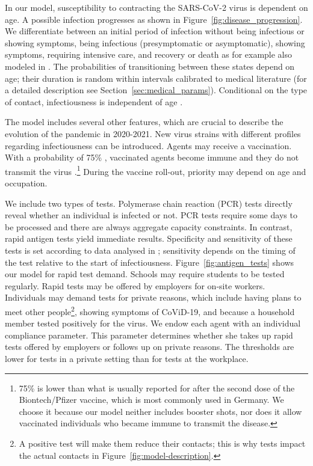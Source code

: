 In our model, susceptibility to contracting the SARS-CoV-2 virus is dependent on age. A
possible infection progresses as shown in Figure~\ref{fig:disease_progression}. We
differentiate between an initial period of infection without being infectious or showing
symptoms, being infectious (presymptomatic or asymptomatic), showing symptoms, requiring
intensive care, and recovery or death as for example also modeled in \cite{Grimm2021}.
The probabilities of transitioning between these states depend on age; their duration is
random within intervals calibrated to medical literature (for a detailed description see
Section~\ref{sec:medical_params}). Conditional on the type of contact, infectiousness is
independent of age \citep{Jones2021}.

The model includes several other features, which are crucial to describe the evolution
of the pandemic in 2020-2021. New virus strains with different profiles regarding
infectiousness can be introduced. Agents may receive a vaccination. With a probability
of 75\% \citep{Hunter2021}, vaccinated agents become immune and they do not transmit the
virus \citep{Petter2021, LevineTiefenbrun2021, Pritchard2021}.\footnote{75\% is lower
than what is usually reported for after the second dose of the Biontech/Pfizer vaccine,
which is most commonly used in Germany. We choose it because our model neither includes
booster shots, nor does it allow vaccinated individuals who became immune to transmit
the disease\citep{Petter2021, LevineTiefenbrun2021, Pritchard2021}.} During the vaccine
roll-out, priority may depend on age and occupation.

We include two types of tests. Polymerase chain reaction (PCR) tests directly reveal
whether an individual is infected or not. PCR tests require some days to be processed
and there are always aggregate capacity constraints. In contrast, rapid antigen tests
yield immediate results. Specificity and sensitivity of these tests is set according to
data analysed in \cite{Bruemmer2021, Smith2021}; sensitivity depends on the timing of
the test relative to the start of infectiousness. Figure~\ref{fig:antigen_tests} shows
our model for rapid test demand. Schools may require students to be tested regularly.
Rapid tests may be offered by employers for on-site workers. Individuals may demand
tests for private reasons, which include having plans to meet other people\footnote{A
positive test will make them reduce their contacts; this is why tests impact the actual
contacts in Figure~\ref{fig:model-description}.}, showing symptoms of CoViD-19, and
because a household member tested positively for the virus. We endow each agent with an
individual compliance parameter. This parameter determines whether she takes up rapid
tests offered by employers or follows up on private reasons. The thresholds are lower
for tests in a private setting than for tests at the workplace.

